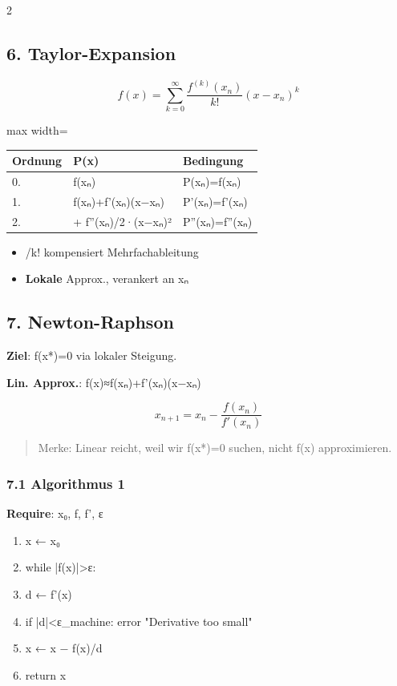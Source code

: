 \documentclass[10pt, a4paper]{article}
\begin{document}
\begin{multicols}{2}
\subsection{6. Taylor-Expansion}

\[
f(x)=\sum_{k=0}^{\infty}\frac{f^{(k)}(x_n)}{k!}(x-x_n)^k
\]



{\small
\begin{adjustbox}{max width=\linewidth}
{\scriptsize
\begin{tabular}{lll}
\toprule
\textbf{Ordnung} & \textbf{P(x)} & \textbf{Bedingung} \\
\midrule
0. & f(xₙ) & P(xₙ)=f(xₙ) \\
1. & f(xₙ)+f'(xₙ)(x−xₙ) & P'(xₙ)=f'(xₙ) \\
2. & + f''(xₙ)/2·(x−xₙ)² & P''(xₙ)=f''(xₙ) \\
\bottomrule
\end{tabular}
}
\end{adjustbox}
}


\begin{itemize}
  \item /k! kompensiert Mehrfachableitung
  \item \textbf{Lokale} Approx., verankert an xₙ
\end{itemize}


\subsection{7. Newton-Raphson}

\textbf{Ziel}: f(x*)=0 via lokaler Steigung.

\textbf{Lin. Approx.}: f(x)≈f(xₙ)+f'(xₙ)(x−xₙ)


\[
x_{n+1}=x_n-\frac{f(x_n)}{f'(x_n)}
\]


\begin{quote}
Merke: Linear reicht, weil wir f(x*)=0 suchen, nicht f(x) approximieren.
\end{quote}


\subsubsection{7.1 Algorithmus 1}
\textbf{Require}: x₀, f, f', ε

\begin{enumerate}
  \item x ← x₀
  \item while |f(x)|>ε:
  \item   d ← f'(x)
  \item   if |d|<ε\_machine: error "Derivative too small"
  \item   x ← x − f(x)/d
  \item return x
\end{enumerate}



\end{multicols}
\end{document}
